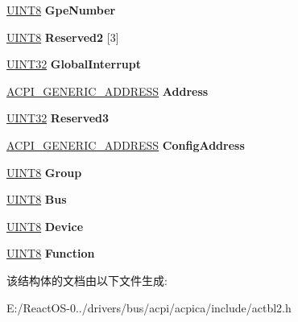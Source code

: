 \begin{DoxyCompactItemize}
\hyperlink{_processor_bind_8h_ab27e9918b538ce9d8ca692479b375b6a}{U\+I\+N\+T8} {\bfseries Gpe\+Number}
\item 
\mbox{\label{structacpi__table__tcpa__server_a7274c3faea1dbc206ea0102e535a0145}} 
\hyperlink{_processor_bind_8h_ab27e9918b538ce9d8ca692479b375b6a}{U\+I\+N\+T8} {\bfseries Reserved2} \mbox{[}3\mbox{]}
\item 
\mbox{\label{structacpi__table__tcpa__server_ab623bf0dd467e569aacb837aff3e0e96}} 
\hyperlink{_processor_bind_8h_ae1e6edbbc26d6fbc71a90190d0266018}{U\+I\+N\+T32} {\bfseries Global\+Interrupt}
\item 
\mbox{\label{structacpi__table__tcpa__server_a5879ee354c530d0f8c4af59ce9f9de8b}} 
\hyperlink{structacpi__generic__address}{A\+C\+P\+I\+\_\+\+G\+E\+N\+E\+R\+I\+C\+\_\+\+A\+D\+D\+R\+E\+SS} {\bfseries Address}
\item 
\mbox{\label{structacpi__table__tcpa__server_a1e3920a7a9dd5800a43a64bac10e2b1e}} 
\hyperlink{_processor_bind_8h_ae1e6edbbc26d6fbc71a90190d0266018}{U\+I\+N\+T32} {\bfseries Reserved3}
\item 
\mbox{\label{structacpi__table__tcpa__server_ab35fa89f9eddc2d22cfc7b4144b2c044}} 
\hyperlink{structacpi__generic__address}{A\+C\+P\+I\+\_\+\+G\+E\+N\+E\+R\+I\+C\+\_\+\+A\+D\+D\+R\+E\+SS} {\bfseries Config\+Address}
\item 
\mbox{\label{structacpi__table__tcpa__server_ad11d95221eba94b9d8b3f9779cbeafa2}} 
\hyperlink{_processor_bind_8h_ab27e9918b538ce9d8ca692479b375b6a}{U\+I\+N\+T8} {\bfseries Group}
\item 
\mbox{\label{structacpi__table__tcpa__server_ac8e97444fa1c34aa6af3d6a0fb6e36be}} 
\hyperlink{_processor_bind_8h_ab27e9918b538ce9d8ca692479b375b6a}{U\+I\+N\+T8} {\bfseries Bus}
\item 
\mbox{\label{structacpi__table__tcpa__server_ab7ee2eaba077228b2a11cd123e681823}} 
\hyperlink{_processor_bind_8h_ab27e9918b538ce9d8ca692479b375b6a}{U\+I\+N\+T8} {\bfseries Device}
\item 
\mbox{\label{structacpi__table__tcpa__server_abcf72ba3568e1003724b318bc46f7739}} 
\hyperlink{_processor_bind_8h_ab27e9918b538ce9d8ca692479b375b6a}{U\+I\+N\+T8} {\bfseries Function}
\end{DoxyCompactItemize}


该结构体的文档由以下文件生成\+:\begin{DoxyCompactItemize}
\item 
E\+:/\+React\+O\+S-\/0../drivers/bus/acpi/acpica/include/actbl2.\+h\end{DoxyCompactItemize}
